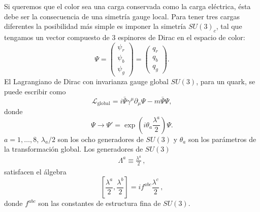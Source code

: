 Si queremos que el color sea una carga conservada como la carga eléctrica, ésta debe ser la consecuencia de una simetría gauge local. Para tener tres cargas diferentes la posibilidad más simple es imponer la simetría $SU(3)_c$, tal que tengamos un vector compuesto de 3 espinores de Dirac en el espacio de color:
\begin{equation}
  \Psi=
  \begin{pmatrix}
    \psi_r\\
    \psi_b\\
    \psi_g
  \end{pmatrix}
  =
  \begin{pmatrix}
    q_r\\
    q_b\\
    q_g
  \end{pmatrix}.
\end{equation}
El Lagrangiano de Dirac con invarianza gauge global $SU(3)$, para un quark, se puede escribir como
\begin{equation}
  \label{eq:128qft}
  \mathcal{L}_{\text{global}}=i\bar{\Psi}\gamma^\mu\partial_\mu\Psi-m\bar{\Psi}\Psi,
\end{equation}
donde
\begin{equation}
  \Psi\to \Psi'=\exp\left(i\theta_a\frac{\lambda^a}{2}\right)\Psi.
\end{equation}
$a=1,\ldots,8$, $\lambda_a/2$ son los ocho generadores de $SU(3)$ y $\theta_a$ son los parámetros de la transformación global. Los generadores de $SU(3)$
\begin{align}
  \Lambda^a\equiv\frac{\lambda^a}{2}\,,
\end{align}
satisfacen el álgebra
\begin{equation}
  \left[\frac{\lambda^a}{2},\frac{\lambda^b}{2}\right]=if^{abc}\frac{\lambda^c}{2}\,,
\end{equation}
donde $f^{abc}$ son las constantes de estructura fina de $SU(3)$.

